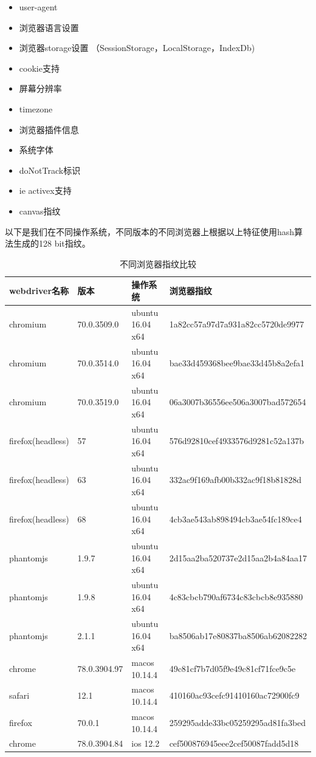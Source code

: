 \documentclass[doctor,privacy,twoside]{buaa_mac}
\begin{document}
\begin{itemize}
\item user-agent
\item 浏览器语言设置
\item 浏览器storage设置 （SessionStorage，LocalStorage，IndexDb)
\item cookie支持
\item 屏幕分辨率
\item timezone
\item 浏览器插件信息
\item 系统字体
\item doNotTrack标识
\item ie activex支持
\item canvas指纹
 \end{itemize}
 
 以下是我们在不同操作系统，不同版本的不同浏览器上根据以上特征使用hash算法生成的128 bit指纹。
 
\centerline{}
\begin{table}[h]
  \caption{不同浏览器指纹比较}
  \label{tab:papercomponents}
  \centering
\begin{tabular}{|p{3cm}<{\centering}||p{3cm}<{\centering}|p{3cm}<{\centering}|p{6cm}<{\centering}|}
    \hline
    webdriver名称 & 版本 & 操作系统 & 浏览器指纹    \\
    \hline
   
chromium & 70.0.3509.0 & ubuntu 16.04 x64 & 1a82cc57a97d7a931a82cc5720de9977 \\
\hline
chromium & 70.0.3514.0 & ubuntu 16.04 x64 & bae33d459368bee9bae33d45b8a2efa1\\
\hline
chromium & 70.0.3519.0 & ubuntu 16.04 x64 & 06a3007b36556ee506a3007bad572654\\
\hline
firefox(headless) & 57 & ubuntu 16.04 x64 & 576d92810cef4933576d9281c52a137b\\
\hline
firefox(headless) & 63 & ubuntu 16.04 x64 & 332ac9f169afb00b332ac9f18b81828d\\
\hline
firefox(headless) & 68 & ubuntu 16.04 x64 & 4cb3ae543ab898494cb3ae54fc189ce4\\
\hline
phantomjs & 1.9.7 & ubuntu 16.04 x64 & 2d15aa2ba520737e2d15aa2b4a84aa17\\
\hline
phantomjs & 1.9.8 & ubuntu 16.04 x64 & 4c83cbcb790af6734c83cbcb8e935880\\
\hline
phantomjs & 2.1.1 & ubuntu 16.04 x64 & ba8506ab17e80837ba8506ab62082282\\
\hline
chrome & 78.0.3904.97 & macos 10.14.4 & 49c81cf7b7d05f9e49c81cf71fce9c5e\\
\hline
safari & 12.1 & macos 10.14.4 & 410160ac93cefc91410160ac72900fc9\\
\hline
firefox & 70.0.1 & macos 10.14.4 & 259295adde33bc05259295ad81fa3bed\\
\hline
chrome & 78.0.3904.84 & ios 12.2 & cef500876945eee2cef50087fadd5d18\\
\hline
    \end{tabular}
\end{table}
\centerline{}
\end{document}
